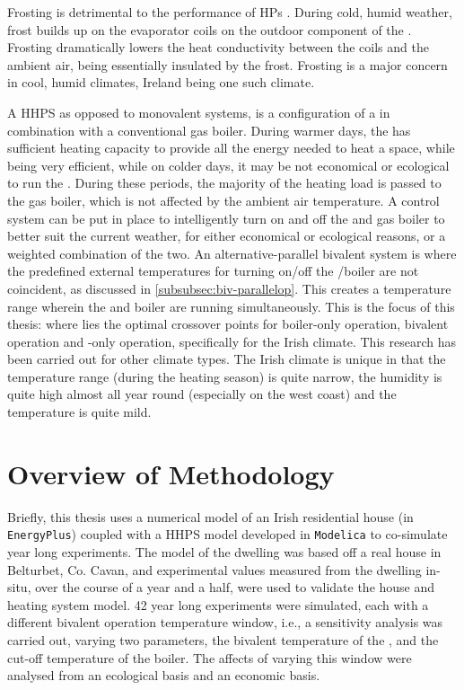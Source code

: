 Frosting is detrimental to the performance of \acp{HP} \cite{di_perna_experimental_2015}. During cold, humid weather, frost builds up on the evaporator coils on the outdoor component of the \HP. Frosting dramatically lowers the heat conductivity between the coils and the ambient air, being essentially insulated by the frost. Frosting is a major concern in cool, humid climates, Ireland being one such climate.

A \ac{HHPS} as opposed to monovalent systems, is a configuration of a \HP in combination with a conventional gas boiler. During warmer days, the \HP has sufficient heating capacity to provide all the energy needed to heat a space, while being very efficient, while on colder days, it may be not economical or ecological to run the \HP. During these periods, the majority of the heating load is passed to the gas boiler, which is not affected by the ambient air temperature. A control system can be put in place to intelligently turn on and off the \HP and gas boiler to better suit the current weather, for either economical or ecological reasons, or a weighted combination of the two. An alternative-parallel bivalent system is where the predefined external temperatures for turning on/off the \HP/boiler are not coincident, as discussed in \cref{subsubsec:biv-parallelop}. This creates a temperature range wherein the \HP and boiler are running simultaneously. This is the focus of this thesis: where lies the optimal crossover points for boiler-only operation, bivalent operation and \HP-only operation, specifically for the Irish climate. This research has been carried out for other climate types. The Irish climate is unique in that the temperature range (during the heating season) is quite narrow, the humidity is quite high almost all year round (especially on the west coast) and the temperature is quite mild.  

\section{Overview of Methodology}
Briefly, this thesis uses a numerical model of an Irish residential house (in \texttt{EnergyPlus}) coupled with a \ac{HHPS} model developed in \texttt{Modelica} to co-simulate year long experiments. The model of the dwelling was based off a real house in Belturbet, Co. Cavan, and experimental values measured from the dwelling in-situ, over the course of a year and a half, were used to validate the house and heating system model. 42 year long experiments were simulated, each with a different bivalent operation temperature window, i.e., a sensitivity analysis was carried out, varying two parameters, the bivalent temperature of the \HP, and the cut-off temperature of the boiler. The affects of varying this window were analysed from an ecological basis and an economic basis. 

